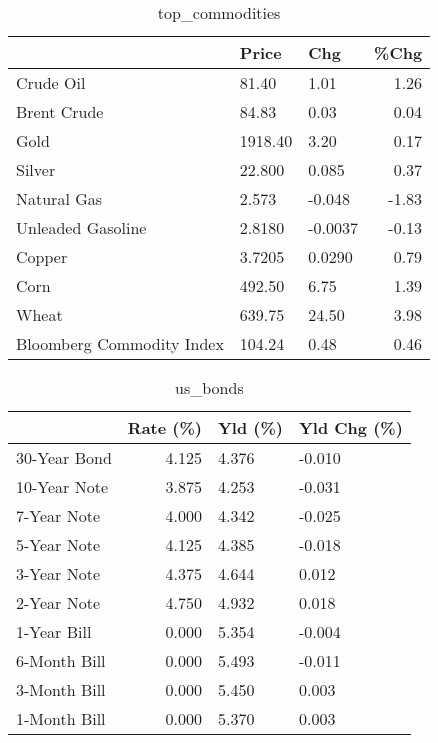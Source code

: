 \documentclass{article}%
\begin{document}
\begin{table}[htbp]%
\caption{top\_commodities}%
\centering%
\begin{adjustbox}{width=1\textwidth}%
\begin{tabular}{lllr}
\toprule
                          &   Price &     Chg &  \%Chg \\
\midrule
               Crude Oil  &   81.40 &    1.01 &  1.26 \\
             Brent Crude  &   84.83 &    0.03 &  0.04 \\
                    Gold  & 1918.40 &    3.20 &  0.17 \\
                  Silver  &  22.800 &   0.085 &  0.37 \\
             Natural Gas  &   2.573 &  -0.048 & -1.83 \\
       Unleaded Gasoline  &  2.8180 & -0.0037 & -0.13 \\
                  Copper  &  3.7205 &  0.0290 &  0.79 \\
                    Corn  &  492.50 &    6.75 &  1.39 \\
                   Wheat  &  639.75 &   24.50 &  3.98 \\
Bloomberg Commodity Index &  104.24 &    0.48 &  0.46 \\
\bottomrule
\end{tabular}
%
\end{adjustbox}%
\end{table}

%


\begin{table}[htbp]%
\caption{us\_bonds}%
\centering%
\begin{adjustbox}{width=1\textwidth}%
\begin{tabular}{lrll}
\toprule
             &  Rate (\%) & Yld (\%) & Yld Chg (\%) \\
\midrule
30-Year Bond &     4.125 &   4.376 &      -0.010 \\
10-Year Note &     3.875 &   4.253 &      -0.031 \\
 7-Year Note &     4.000 &   4.342 &      -0.025 \\
 5-Year Note &     4.125 &   4.385 &      -0.018 \\
 3-Year Note &     4.375 &   4.644 &       0.012 \\
 2-Year Note &     4.750 &   4.932 &       0.018 \\
 1-Year Bill &     0.000 &   5.354 &      -0.004 \\
6-Month Bill &     0.000 &   5.493 &      -0.011 \\
3-Month Bill &     0.000 &   5.450 &       0.003 \\
1-Month Bill &     0.000 &   5.370 &       0.003 \\
\bottomrule
\end{tabular}
%
\end{adjustbox}%
\end{table}
\end{document}

